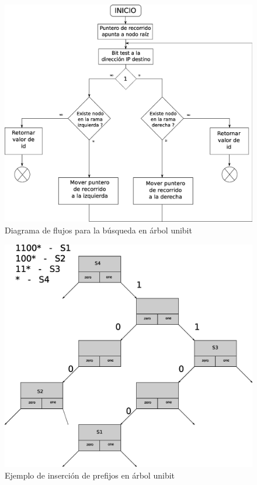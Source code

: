 \begin{figure}[H]
  \centering
	\includegraphics[scale=0.35]{4-implementacion/graf/utlsearch.eps}
  \caption{Diagrama de flujos para la búsqueda en árbol unibit}
  \label{fig:utlsearch}
\end{figure}

\begin{figure}[H]
  \centering
	\includegraphics[scale=0.50]{4-implementacion/graf/lluinsert09.eps}
  \caption{Ejemplo de inserción de prefijos en árbol unibit}
  \label{fig:lluinsert}
\end{figure}

